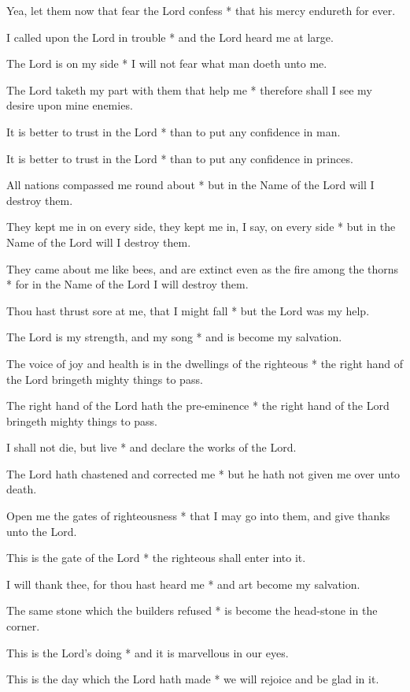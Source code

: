 Yea, let them now that fear the Lord confess * that his mercy endureth for ever.

I called upon the Lord in trouble * and the Lord heard me at large.

The Lord is on my side * I will not fear what man doeth unto me.

The Lord taketh my part with them that help me * therefore shall I see my desire upon mine enemies.

It is better to trust in the Lord * than to put any confidence in man.

It is better to trust in the Lord * than to put any confidence in princes.

All nations compassed me round about * but in the Name of the Lord will I destroy them.

They kept me in on every side, they kept me in, I say, on every side * but in the Name of the Lord will I destroy them.

They came about me like bees, and are extinct even as the fire among the thorns * for in the Name of the Lord I will destroy them.

Thou hast thrust sore at me, that I might fall * but the Lord was my help.

The Lord is my strength, and my song * and is become my salvation.

The voice of joy and health is in the dwellings of the righteous * the right hand of the Lord bringeth mighty things to pass.

The right hand of the Lord hath the pre-eminence * the right hand of the Lord bringeth mighty things to pass.

I shall not die, but live * and declare the works of the Lord.

The Lord hath chastened and corrected me * but he hath not given me over unto death.

Open me the gates of righteousness * that I may go into them, and give thanks unto the Lord.

This is the gate of the Lord * the righteous shall enter into it.

I will thank thee, for thou hast heard me * and art become my salvation.

The same stone which the builders refused * is become the head-stone in the corner.

This is the Lord's doing * and it is marvellous in our eyes.

This is the day which the Lord hath made * we will rejoice and be glad in it.

